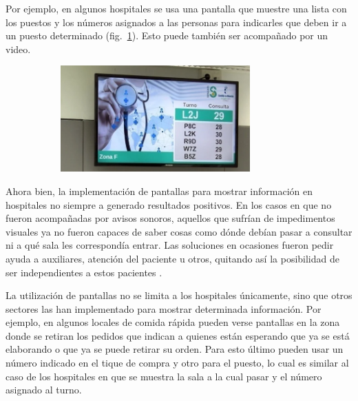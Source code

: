 \documentclass{article}
\begin{document}
Por ejemplo, en algunos hospitales se usa una pantalla que muestre una lista con los puestos y los números asignados a las personas para indicarles que deben ir a un puesto determinado (fig.~\ref{fig:hospital}). Esto puede también ser acompañado por un video. 
\begin{figure}[H]
	\caption{Hospital con pantalla para distribuir pacientes}
    \begin{subfigure}{1.0\textwidth}
	\includegraphics[width=0.8\textwidth]{hospital.png}
    \end{subfigure}
	\label{fig:hospital}
\end{figure}
\vspace{-1.0\baselineskip}
Ahora bien, la implementación de pantallas para mostrar información en hospitales no siempre a generado resultados positivos. En los casos en que no fueron acompañadas por avisos sonoros, aquellos que sufrían de impedimentos visuales ya no fueron capaces de saber cosas como dónde debían pasar a consultar ni a qué sala les correspondía entrar. Las soluciones en ocasiones fueron pedir ayuda a auxiliares, atención del paciente u otros, quitando así la posibilidad de ser independientes a estos pacientes \parencite{pantallasChange}.

La utilización de pantallas no se limita a los hospitales únicamente, sino que otros sectores las han implementado para mostrar determinada información. Por ejemplo, en algunos locales de comida rápida pueden verse pantallas en la zona donde se retiran los pedidos que indican a quienes están esperando que ya se está elaborando o que ya se puede retirar su orden. Para esto último pueden usar un número indicado en el tique de compra y otro para el puesto, lo cual es similar al caso de los hospitales en que se muestra la sala a la cual pasar y el número asignado al turno.
\end{document}
